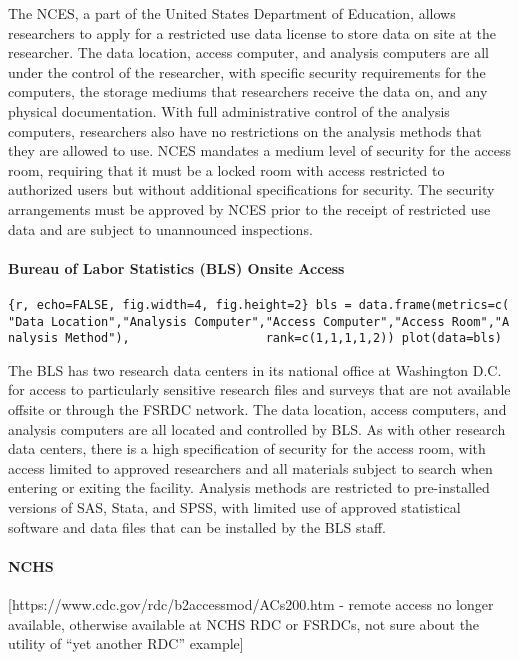 The NCES, a part of the United States Department of Education, allows
researchers to apply for a restricted use data license to store data on
site at the researcher. The data location, access computer, and analysis
computers are all under the control of the researcher, with specific
security requirements for the computers, the storage mediums that
researchers receive the data on, and any physical documentation. With
full administrative control of the analysis computers, researchers also
have no restrictions on the analysis methods that they are allowed to
use. NCES mandates a medium level of security for the access room,
requiring that it must be a locked room with access restricted to
authorized users but without additional specifications for security. The
security arrangements must be approved by NCES prior to the receipt of
restricted use data and are subject to unannounced inspections.

\hypertarget{bureau-of-labor-statistics-bls-onsite-access}{%
\paragraph{Bureau of Labor Statistics (BLS) Onsite
Access}\label{bureau-of-labor-statistics-bls-onsite-access}}

\texttt{\{r,\ echo=FALSE,\ fig.width=4,\ fig.height=2\}\ bls\ =\ data.frame(metrics=c("Data\ Location","Analysis\ Computer","Access\ Computer","Access\ Room","Analysis\ Method"),\ \ \ \ \ \ \ \ \ \ \ \ \ \ \ \ \ \ \ rank=c(1,1,1,1,2))\ plot(data=bls)}

The BLS has two research data centers in its national office at
Washington D.C. for access to particularly sensitive research files and
surveys that are not available offsite or through the FSRDC network. The
data location, access computers, and analysis computers are all located
and controlled by BLS. As with other research data centers, there is a
high specification of security for the access room, with access limited
to approved researchers and all materials subject to search when
entering or exiting the facility. Analysis methods are restricted to
pre-installed versions of SAS, Stata, and SPSS, with limited use of
approved statistical software and data files that can be installed by
the BLS staff.

\hypertarget{nchs}{%
\paragraph{NCHS}\label{nchs}}

{[}https://www.cdc.gov/rdc/b2accessmod/ACs200.htm - remote access no
longer available, otherwise available at NCHS RDC or FSRDCs, not sure
about the utility of ``yet another RDC'' example{]}
